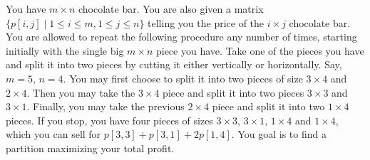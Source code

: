 \documentclass[11pt]{article}
\begin{document}
You have $m\times n$ chocolate bar. You are also given a matrix
$\{p[i,j]\mid 1\le i\le m, 1\le j\le n\}$ telling you the price of the
$i\times j$ chocolate bar. You are allowed to repeat the following
procedure any number of times, starting initially with the single big
$m\times n$ piece you have. Take one of the pieces you have and split
it into two pieces by cutting it either vertically or
horizontally. Say, $m=5$, $n=4$. You may first choose to split it into
two pieces of size $3\times 4$ and $2\times 4$. Then you may take the
$3\times 4$ piece and split it into two pieces $3\times 3$ and
$3\times 1$. Finally, you may take the previous $2\times 4$ piece and
split it into two $1\times 4$ pieces. If you stop, you have
four pieces of sizes $3\times 3$, $3\times 1$, $1\times 4$ and
$1\times 4$, which you can sell for $p[3,3]+p[3,1]+2p[1,4]$.
You goal is to find a partition maximizing your total profit.
\end{document}
